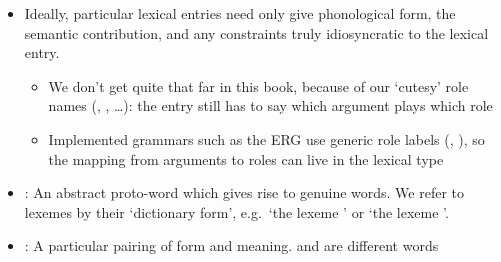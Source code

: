 \documentclass[a4paper,landscape,headrule,footrule]{foils}
\begin{document}

\begin{itemize}
\item Ideally, particular lexical entries need only give
  phonological form, the semantic contribution,
  and any constraints truly idiosyncratic to the
  lexical entry.
  \begin{itemize}
  \item We don't get quite that far in this book, because of our
    `cutesy' role names (, , \ldots): the entry
    still has to say which argument plays which role
  \item Implemented grammars such as the ERG use generic role labels
    (, ), so the mapping from arguments to roles can
    live in the lexical type
  \end{itemize}
\end{itemize}

\begin{itemize}
\item {}: An abstract proto-word which gives rise
  to genuine words. We refer to lexemes by their
  `dictionary form', e.g.\ `the lexeme ' or `the
  lexeme '.
\item {}: A particular pairing of form and meaning.
   and  are different words
\end{itemize}
\end{document}

